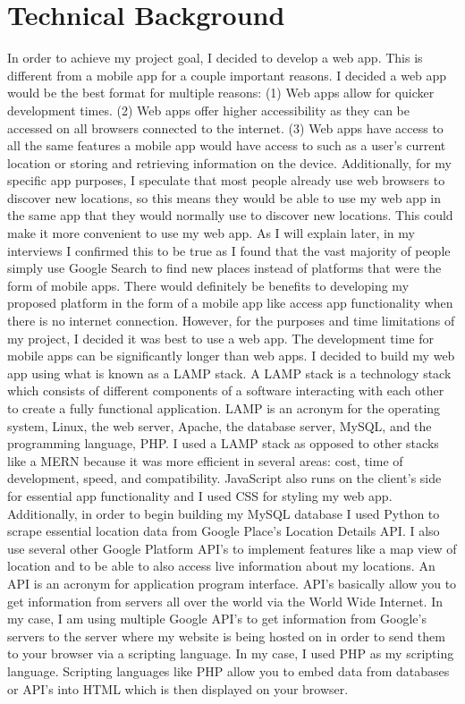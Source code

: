 \documentclass[12pt,twocolumn]{article}
\begin{document}
\section{Technical Background}
In order to achieve my project goal, I decided to develop a web app. This is different from a mobile app for a couple important reasons.  I decided a web app would be the best format for multiple reasons: (1) Web apps allow for quicker development times. (2)  Web apps offer higher accessibility as they can be accessed on all browsers connected to the internet. (3) Web apps have access to all the same features a mobile app would have access to such as a user's current location or storing and retrieving information on the device. Additionally, for my specific app purposes, I speculate that most people already use web browsers  to discover new locations, so this means they would be able to use my web app in the same app that they would normally use to discover new locations. This could make it more convenient to use my web app. As I will explain later, in my interviews I confirmed this to be true as I found that the vast majority of people simply use Google Search to find new places instead of platforms that were the form of mobile apps. There would definitely be benefits to developing my proposed platform in the form of a mobile app like access app functionality when there is no internet connection. However, for the purposes and time limitations of my project, I decided it was best to use a web app. The development time for mobile apps can be significantly longer than web apps. 
I decided to build my web app using what is known as a LAMP stack. A LAMP stack is a technology stack which consists of different components of a software interacting with each other to create a fully functional application. LAMP is an acronym for the operating system, Linux, the web server, Apache, the database server, MySQL, and the programming language, PHP. I used a LAMP stack as opposed to other stacks like a MERN because it was more efficient in several areas: cost, time of development, speed, and compatibility. JavaScript also runs on the client’s side for essential app functionality and I used CSS for styling my web app. 
Additionally, in order to begin building my MySQL database I used Python to scrape essential location data from Google Place’s Location Details API. I also use several other Google Platform API’s to implement features like a map view of location and to be able to also access live  information about my locations. An API is an acronym for application program interface. API’s basically allow you to get information from servers all over the world via the World Wide Internet. In my case, I am using multiple Google API’s to get information from Google’s servers to the server where my website is being hosted on in order to send them to your browser via a scripting language. In my case, I used PHP as my scripting language. Scripting languages like PHP allow you to embed data from databases or API’s into HTML which is then displayed on your browser. 
\end{document}
